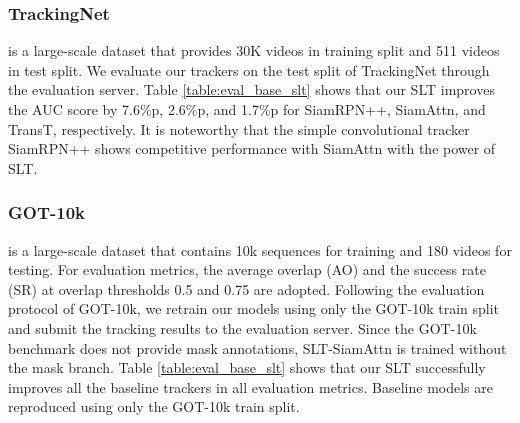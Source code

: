 \subsubsection{TrackingNet~\cite{trackingnet}} is a large-scale dataset that provides 30K videos in training split and 511 videos in test split.
We evaluate our trackers on the test split of TrackingNet through the evaluation server.
Table \ref{table:eval_base_slt} shows that our SLT improves the AUC score by 7.6\%p, 2.6\%p, and 1.7\%p for SiamRPN++, SiamAttn, and TransT, respectively. It is noteworthy that the simple convolutional tracker SiamRPN++ shows competitive performance with SiamAttn with the power of SLT.



\subsubsection{GOT-10k~\cite{got10k}}
is a large-scale dataset that contains 10k sequences for training and 180 videos for testing.
For evaluation metrics, the average overlap (AO) and the success rate (SR) at overlap thresholds 0.5 and 0.75 are adopted.
Following the evaluation protocol of GOT-10k, we retrain our models using only the GOT-10k train split and submit the tracking results to the evaluation server.
Since the GOT-10k benchmark does not provide mask annotations, SLT-SiamAttn is trained without the mask branch.
Table \ref{table:eval_base_slt} shows that our SLT successfully improves all the baseline trackers in all evaluation metrics.
Baseline models are reproduced using only the GOT-10k train split.



